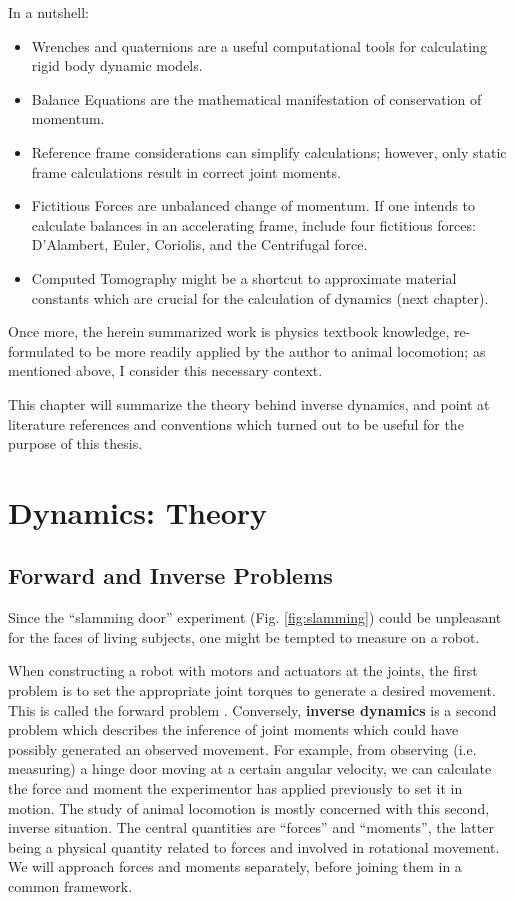 \documentclass[10pt,a4paper]{article}
\begin{document}
In a nutshell:
\begin{itemize}
\item Wrenches and quaternions are a useful computational tools for calculating rigid body dynamic models.
\item Balance Equations are the mathematical manifestation of conservation of momentum.
\item Reference frame considerations can simplify calculations; however, only static frame calculations result in correct joint moments.
\item Fictitious Forces are unbalanced change of momentum. If one intends to calculate balances in an accelerating frame, include four fictitious forces: D’Alambert, Euler, Coriolis, and the Centrifugal force.
\item Computed Tomography might be a shortcut to approximate material constants which are crucial for the calculation of dynamics (next chapter).
\end{itemize}


Once more, the herein summarized work is physics textbook knowledge, re-formulated to be more readily applied by the author to animal locomotion; as mentioned above, I consider this necessary context.

This chapter will summarize the theory behind inverse dynamics, and point at literature references and conventions which turned out to be useful for the purpose of this thesis.


\section{Dynamics: Theory}
\label{sec:org5f5df12}
\subsection{Forward and Inverse Problems}
\label{sec:org2966af5}
Since the ``slamming door'' experiment (Fig. \ref{fig:slamming}) could be unpleasant for the faces of living subjects, one might be tempted to measure on a robot.

When constructing a robot with motors and actuators at the joints, the first problem is to set the appropriate joint torques to generate a desired movement.
This is called the forward problem \citep{Lynch2017}.
Conversely, \textbf{inverse dynamics} is a second problem which describes the inference of joint moments which could have possibly generated an observed movement.
For example, from observing (i.e. measuring) a hinge door moving at a certain angular velocity, we can calculate the force and moment the experimentor has applied previously to set it in motion.
The study of animal locomotion is mostly concerned with this second, inverse situation.
The central quantities are ``forces'' and ``moments'', the latter being a physical quantity related to forces and involved in rotational movement.
We will approach forces and moments separately, before joining them in a common framework.
\end{document}
